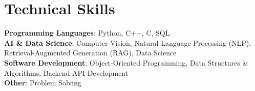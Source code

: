 \documentclass[letterpaper,11pt]{article}
\begin{document}
\section{Technical Skills}
 \begin{itemize}[leftmargin=0.15in, label={}]
    \small{\item{
           \textbf{Programming Languages}{: Python, C++, C, SQL} \\
           \textbf{AI \& Data Science}{: Computer Vision, Natural Language Processing (NLP), Retrieval-Augmented Generation (RAG), Data Science} \\
           \textbf{Software Development}{: Object-Oriented Programming, Data Structures \& Algorithms, Backend API Development} \\
           \textbf{Other}{: Problem Solving} \\
         }}
 \end{itemize}
\end{document}
